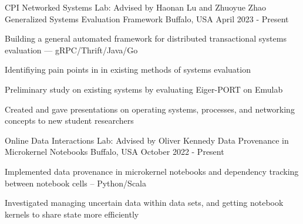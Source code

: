 

\begin{cventries}


  \cventry
    {CPI Networked Systems Lab: Advised by Haonan Lu and Zhuoyue Zhao} %
    {Generalized Systems Evaluation Framework} %
    {Buffalo, USA} %
    {April 2023 - Present} %
    {
      \begin{cvitems} %
        \item Building a general automated framework for distributed transactional systems evaluation --- gRPC/Thrift/Java/Go
        \item Identifiying pain points in in existing methods of systems evaluation
        \item Preliminary study on existing systems by evaluating Eiger-PORT on Emulab
        \item Created and gave presentations on operating systems, processes, and networking concepts to new student researchers
      \end{cvitems}
    }


  \cventry
    {Online Data Interactions Lab: Advised by Oliver Kennedy} %
    {Data Provenance in Microkernel Notebooks} %
    {Buffalo, USA} %
    {October 2022 - Present} %
    {
      \begin{cvitems} %
        \item Implemented data provenance in microkernel notebooks and dependency tracking between notebook cells -- Python/Scala
        \item Investigated managing uncertain data within data sets, and getting notebook kernels to share state more efficiently
      \end{cvitems}
    }

\end{cventries}
